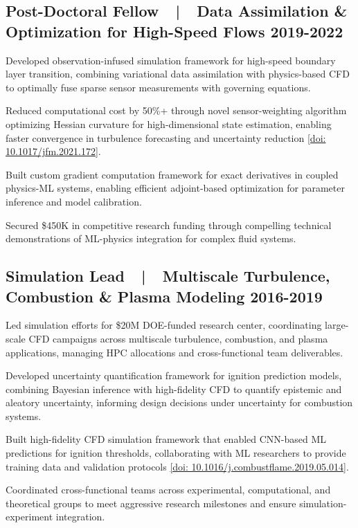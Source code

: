 \subsection{{Post-Doctoral Fellow~~|~~Data Assimilation \& Optimization for High-Speed Flows \hfill 2019-2022}}
\begin{zitemize}
\item Developed observation-infused simulation framework for high-speed boundary layer transition, combining variational data assimilation with physics-based CFD to optimally fuse sparse sensor measurements with governing equations.
\item Reduced computational cost by 50\%+ through novel sensor-weighting algorithm optimizing Hessian curvature for high-dimensional state estimation, enabling faster convergence in turbulence forecasting and uncertainty reduction \href{https://doi.org/10.1017/jfm.2021.172}{[doi: 10.1017/jfm.2021.172]}.
\item Built custom gradient computation framework for exact derivatives in coupled physics-ML systems, enabling efficient adjoint-based optimization for parameter inference and model calibration.
\item Secured \$450K in competitive research funding through compelling technical demonstrations of ML-physics integration for complex fluid systems.
\end{zitemize}

\subsection{{Simulation Lead~~|~~Multiscale Turbulence, Combustion \& Plasma Modeling \hfill 2016-2019}}
\begin{zitemize}
\item Led simulation efforts for \$20M DOE-funded research center, coordinating large-scale CFD campaigns across multiscale turbulence, combustion, and plasma applications, managing HPC allocations and cross-functional team deliverables.
\item Developed uncertainty quantification framework for ignition prediction models, combining Bayesian inference with high-fidelity CFD to quantify epistemic and aleatory uncertainty, informing design decisions under uncertainty for combustion systems.
\item Built high-fidelity CFD simulation framework that enabled CNN-based ML predictions for ignition thresholds, collaborating with ML researchers to provide training data and validation protocols \href{https://doi.org/10.1016/j.combustflame.2019.05.014}{[doi: 10.1016/j.combustflame.2019.05.014]}.
\item Coordinated cross-functional teams across experimental, computational, and theoretical groups to meet aggressive research milestones and ensure simulation-experiment integration.
\end{zitemize}

